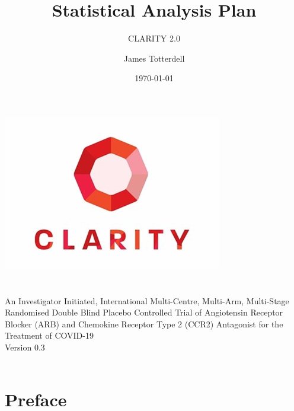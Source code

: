 \documentclass[11pt,parskip=half-]{scrartcl}
\begin{document}
\title{Statistical Analysis Plan}
\subtitle{CLARITY 2.0}
\author{James Totterdell}
\date{\today}
\makeatletter
\begin{titlepage}
    \begin{center}
        \includegraphics[width=0.7\linewidth]{clarity-logo.jpg}\\[4ex]
        {\huge \bfseries  \@title }\\[2ex]
        {\LARGE \bfseries  \@subtitle }\\[2ex]
        {\large An Investigator Initiated, International Multi-Centre, Multi-Arm, Multi-Stage
        Randomised Double Blind Placebo Controlled Trial of Angiotensin Receptor
        Blocker (ARB) and Chemokine Receptor Type 2 (CCR2) Antagonist for the Treatment
        of COVID-19}\\[2ex]
        {\LARGE Version 0.3}\\[2ex]
        {\LARGE \@date}\\[10ex]
    \end{center}
\end{titlepage}
\makeatother
\thispagestyle{empty}
\newpage

\tableofcontents

\clearpage

\section*{Preface}
\end{document}
